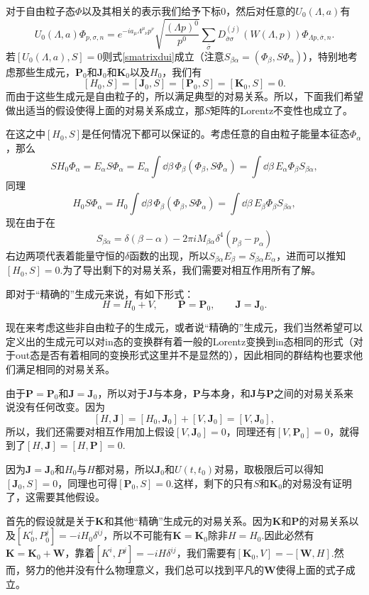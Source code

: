\documentclass[9pt]{extbook}
\begin{document}
对于自由粒子态$\Phi$以及其相关的表示我们给予下标0，然后对任意的$U_0(\Lambda,a)$有
\[
U_0(\Lambda,a)\Phi_{p,\sigma,n}=e^{-ia_\mu\Lambda^\mu_{\phantom{\mu}\nu}p^\nu}\sqrt{\frac{(\Lambda p)^0}{p^0}}\sum_{\bar{\sigma}} D^{(j)}_{\bar{\sigma}\sigma}(W(\Lambda,p))\Phi_{\Lambda p,\bar{\sigma},n}.
\]
若$[U_0(\Lambda,a),S]=0$则式\eqref{smatrixdui}成立（注意$S_{\beta\alpha}=(\Phi_\beta,S\Phi_\alpha)$），特别地考虑那些生成元，$\bm{P}_0$和$\bm{J}_0$和$\bm{K}_0$以及$H_0$，我们有
\[
	[H_0,S]=[\bm{J}_0,S]=[\bm{P}_0,S]=[\bm{K}_0,S]=0.
\]
而由于这些生成元是自由粒子的，所以满足典型的对易关系。所以，下面我们希望做出适当的假设使得上面的对易关系成立，那$S$矩阵的Lorentz不变性也成立了。

在这之中$[H_0,S]$是任何情况下都可以保证的。考虑任意的自由粒子能量本征态$\Phi_\alpha$，那么
\[
	SH_0\Phi_\alpha=E_\alpha S\Phi_\alpha=E_\alpha\int \dd \beta\, \Phi_\beta(\Phi_\beta,S\Phi_\alpha)=\int \dd \beta\, E_\alpha\Phi_\beta S_{\beta\alpha},
\]
同理
\[
	H_0S\Phi_\alpha=H_0\int \dd \beta\, \Phi_\beta(\Phi_\beta,S\Phi_\alpha)=\int \dd \beta\, E_\beta \Phi_\beta S_{\beta\alpha},
\]
现在由于在
\[
S_{\beta\alpha}=\delta(\beta-\alpha)-2\pi iM_{\beta\alpha}\delta^4(p_\beta-p_\alpha)
\]
右边两项代表着能量守恒的$\delta$函数的出现，所以$S_{\beta\alpha}E_\beta=S_{\beta\alpha}E_\alpha$，进而可以推知$[H_0,S]=0$.为了导出剩下的对易关系，我们需要对相互作用所有了解。

即对于“精确的”生成元来说，有如下形式：
\[
H=H_0+V,\qquad \bm{P}=\bm{P}_0,\qquad\bm{J}=\bm{J}_0.
\]

现在来考虑这些非自由粒子的生成元，或者说“精确的”生成元，我们当然希望可以定义出的生成元可以对in态的变换群有着一般的Lorentz变换到in态相同的形式（对于out态是否有着相同的变换形式这里并不是显然的），因此相同的群结构也要求他们满足相同的对易关系。

由于$\bm{P}=\bm{P}_0$和$\bm{J}=\bm{J}_0$，所以对于$\bm{J}$与本身，$\bm{P}$与本身，和$\bm{J}$与$\bm{P}$之间的对易关系来说没有任何改变。因为
\[
	[H,\bm{J}]=[H_0,\bm{J}_0]+[V,\bm{J}_0]=[V,\bm{J}_0],
\]
所以，我们还需要对相互作用加上假设$[V,\bm{J}_0]=0$，同理还有$[V,\bm{P}_0]=0$，就得到了$[H,\bm{J}]=[H,\bm{P}]=0$.

因为$\bm{J}=\bm{J}_0$和$H_0$与$H$都对易，所以$\bm{J}_0$和$U(t,t_0)$对易，取极限后可以得知$[\bm{J}_0,S]=0$，同理也可得$[\bm{P}_0,S]=0$.这样，剩下的只有$S$和$\bm{K}_0$的对易没有证明了，这需要其他假设。

首先的假设就是关于$\bm{K}$和其他“精确”生成元的对易关系。因为$\bm{K}$和$\bm{P}$的对易关系以及$[K^i_0,P^j_0]=-iH_0\delta^{ij}$，所以不可能有$\bm{K}=\bm{K}_0$除非$H=H_0$.因此必然有$\bm{K}=\bm{K}_0+\bm{W}$，靠着$[K^i,P^j]=-iH\delta^{ij}$，我们需要有$[\bm{K}_0,V]=-[\bm{W},H]$.然而，努力的他并没有什么物理意义，我们总可以找到平凡的$\bm{W}$使得上面的式子成立。
\end{document}

